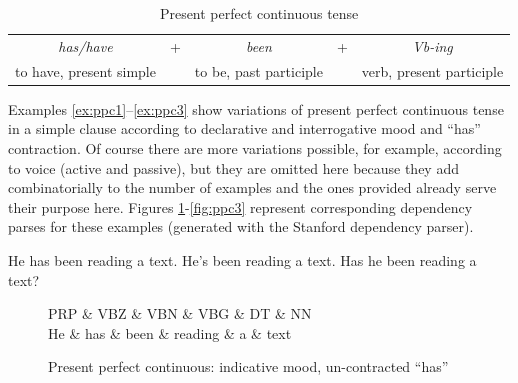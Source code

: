     \begin{table}[!ht]
    	\centering
    	\begin{tabular}{|clclc|}
    		\hline
    		\textit{has/have}       & + & \textit{been}          & + & \textit{Vb-ing}          \\
    		to have, present simple &   & to be, past participle &   & verb, present participle \\ \hline
    	\end{tabular}
    	\caption{Present perfect continuous tense}
    	\label{tab:ppc-pattern}
    \end{table}

    Examples \ref{ex:ppc1}--\ref{ex:ppc3} show variations of present perfect continuous tense in a simple clause according to declarative and interrogative mood and ``has'' contraction. Of course there are more variations possible, for example, according to voice (active and passive), but they are omitted here because they add combinatorially to the number of examples and the ones provided already serve their purpose here. Figures \ref{fig:ppc1}-\ref{fig:ppc3} represent corresponding dependency parses for these examples (generated with the Stanford dependency parser).

    \begin{exe}
    	\ex\label{ex:ppc1} He has been reading a text.
    	\ex\label{ex:ppc2} He's been reading a text.
    	\ex\label{ex:ppc3} Has he been reading a text?
    \end{exe}

	\begin{figure}[!ht]
		\centering
		\begin{dependency}
			\begin{deptext}[]
				PRP \& VBZ \& VBN \& VBG \& DT \& NN \\
				He \& has \& been \& reading \& a \& text \\
			\end{deptext}
		\end{dependency}
		\caption{Present perfect continuous: indicative mood, un-contracted ``has''}
		\label{fig:ppc1}
	\end{figure}

